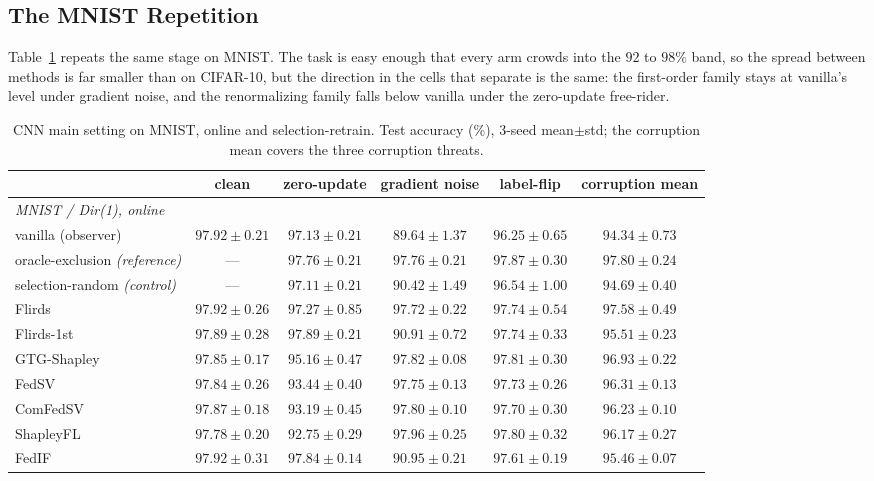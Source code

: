 \documentclass[letterpaper]{article} %
\theoremstyle{plain}
\begin{document}
\subsection{The MNIST Repetition}
\label{app:mnist-rep}

Table~\ref{tab:mnist-int} repeats the same stage on MNIST. The task is easy
enough that every arm crowds into the $92$ to $98\%$ band, so the spread
between methods is far smaller than on CIFAR-10, but the direction in the
cells that separate is the same: the first-order family stays at vanilla's
level under gradient noise, and the renormalizing family falls below vanilla
under the zero-update free-rider.

\begin{table}[t]
\centering
\small
\caption{CNN main setting on MNIST, online and selection-retrain. Test
accuracy (\%), 3-seed mean$\pm$std; the corruption mean covers the three
corruption threats.}
\label{tab:mnist-int}
\begin{tabular}{lccccc}
\hline
 & clean & zero-update & gradient noise & label-flip & corruption mean \\
\hline
\multicolumn{6}{l}{\emph{MNIST / Dir(1), online}} \\
vanilla (observer) & $97.92\pm0.21$ & $97.13\pm0.21$ & $89.64\pm1.37$ & $96.25\pm0.65$ & $94.34\pm0.73$ \\
oracle-exclusion \emph{(reference)} & --- & $97.76\pm0.21$ & $97.76\pm0.21$ & $97.87\pm0.30$ & $97.80\pm0.24$ \\
selection-random \emph{(control)} & --- & $97.11\pm0.21$ & $90.42\pm1.49$ & $96.54\pm1.00$ & $94.69\pm0.40$ \\
Flirds & $97.92\pm0.26$ & $97.27\pm0.85$ & $97.72\pm0.22$ & $97.74\pm0.54$ & $97.58\pm0.49$ \\
Flirds-1st & $97.89\pm0.28$ & $97.89\pm0.21$ & $90.91\pm0.72$ & $97.74\pm0.33$ & $95.51\pm0.23$ \\
GTG-Shapley & $97.85\pm0.17$ & $95.16\pm0.47$ & $97.82\pm0.08$ & $97.81\pm0.30$ & $96.93\pm0.22$ \\
FedSV & $97.84\pm0.26$ & $93.44\pm0.40$ & $97.75\pm0.13$ & $97.73\pm0.26$ & $96.31\pm0.13$ \\
ComFedSV & $97.87\pm0.18$ & $93.19\pm0.45$ & $97.80\pm0.10$ & $97.70\pm0.30$ & $96.23\pm0.10$ \\
ShapleyFL & $97.78\pm0.20$ & $92.75\pm0.29$ & $97.96\pm0.25$ & $97.80\pm0.32$ & $96.17\pm0.27$ \\
FedIF & $97.92\pm0.31$ & $97.84\pm0.14$ & $90.95\pm0.21$ & $97.61\pm0.19$ & $95.46\pm0.07$ \\

\end{tabular}
\end{table}
\end{document}
